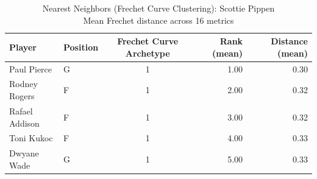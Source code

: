 \begin{table}[t]
\caption*{
{\fontsize{20}{25} Nearest Neighbors (Frechet Curve Clustering): Scottie Pippen\fontsize{12}{15}\selectfont } \\ 
{\fontsize{14}{17}\selectfont  Mean Frechet distance across 16 metrics\fontsize{12}{15}\selectfont }
} 
\fontsize{12.0pt}{14.0pt}\selectfont
\begin{tabular*}{\linewidth}{@{\extracolsep{\fill}}llcrr}
\toprule
Player & Position & Frechet Curve Archetype & Rank (mean) & Distance (mean) \\ 
\midrule\addlinespace[2.5pt]
Paul Pierce & G & 1 & 1.00 & 0.30 \\ 
Rodney Rogers & F & 1 & 2.00 & 0.32 \\ 
Rafael Addison & F & 1 & 3.00 & 0.32 \\ 
Toni Kukoc & F & 1 & 4.00 & 0.33 \\ 
Dwyane Wade & G & 1 & 5.00 & 0.33 \\ 
\bottomrule
\end{tabular*}
\end{table}

